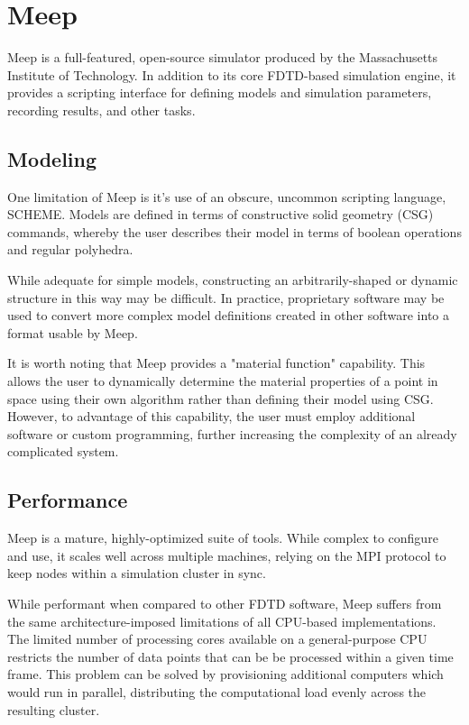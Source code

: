 \chapter{Meep} \label{ch:meep}

Meep is a full-featured, open-source simulator produced by the Massachusetts Institute of Technology. In addition to its core FDTD-based simulation engine, it provides a scripting interface for defining models and simulation parameters, recording results, and other tasks.  


\section{Modeling}

One limitation of Meep is it's use of an obscure, uncommon scripting language, SCHEME. Models are defined in terms of constructive solid geometry (CSG) commands, whereby the user describes their model in terms of boolean operations and regular polyhedra. 

While adequate for simple models, constructing an arbitrarily-shaped or dynamic structure in this way may be difficult. In practice, proprietary software may be used to convert more complex model definitions created in other software into a format usable by Meep.

It is worth noting that Meep provides a "material function" capability. This allows the user to dynamically determine the material properties of a point in space using their own algorithm rather than defining their model using CSG. However, to advantage of this capability, the user must employ additional software or custom programming, further increasing the complexity of an already complicated system. 



\section{Performance}

Meep is a mature, highly-optimized suite of tools. While complex to configure and use, it scales well across multiple machines, relying on the MPI protocol to keep nodes within a simulation cluster in sync. 

While performant when compared to other FDTD software, Meep suffers from the same architecture-imposed limitations of all CPU-based implementations. The limited number of processing cores available on a general-purpose CPU restricts the number of data points that can be be processed within a given time frame. This problem can be solved by provisioning additional computers which would run in parallel, distributing the computational load evenly across the resulting cluster.

